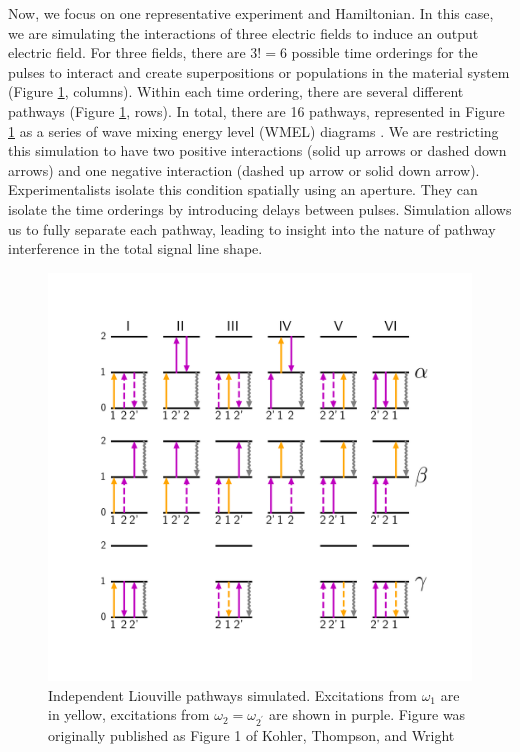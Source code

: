 Now, we focus on one representative experiment and Hamiltonian. In this
case, we are simulating the interactions of three electric fields to
induce an output electric field. For three fields, there are \(3! = 6\)
possible time orderings for the pulses to interact and create
superpositions or populations in the material system (Figure
\ref{sim:fig:WMELs}, columns). Within each time ordering, there are
several different pathways (Figure \ref{sim:fig:WMELs}, rows). In total,
there are 16 pathways, represented in Figure \ref{sim:fig:WMELs} as a
series of wave mixing energy level (WMEL) diagrams \cite{Lee_1985}.
We are restricting this simulation to have two positive interactions
(solid up arrows or dashed down arrows) and one negative interaction
(dashed up arrow or solid down arrow). Experimentalists isolate this
condition spatially using an aperture. They can isolate the time
orderings by introducing delays between pulses. Simulation allows us to
fully separate each pathway, leading to insight into the nature of
pathway interference in the total signal line shape.

\begin{figure}
\centering
\includegraphics{simulation/images/WMELs.png}
\caption{Independent Liouville pathways simulated. Excitations from
\(\omega_1\) are in yellow, excitations from
\(\omega_2 = \omega_{2^\prime}\) are shown in purple. Figure was
originally published as Figure 1 of Kohler, Thompson, and Wright
\cite{KohlerDanielDavid2017a} \label{sim:fig:WMELs}}
\end{figure}

